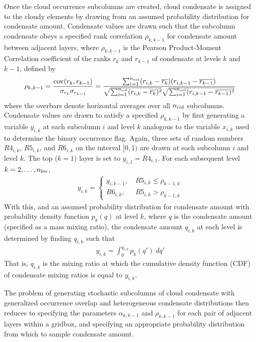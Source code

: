 Once the cloud occurrence subcolumns are created, cloud condensate is assigned to the cloudy elements by drawing from an assumed probability distribution for condensate amount. Condensate values are drawn such that the subcolumn condensate obeys a specified rank correlation $\rho_{k, k-1}$ for condensate amount between adjacent layers, where $\rho_{k, k-1}$ is the Pearson Product-Moment Correlation coefficient of the ranks $r_{k}$ and $r_{k-1}$ of condensate at levels $k$ and $k-1$, defined by
\begin{gather}
    \rho_{k, k-1} = \frac{
        {\rm cov}(r_{k}, r_{k-1})
    }{
        \sigma_{r_{k}} \sigma_{r_{k-1}}
    } = \frac{
        \sum_{i=1}^{n_{\rm col}} (r_{i, k} - \overline{r_{k}})(r_{i, k-1} - \overline{r_{k-1}})
    }{
        \sqrt{\sum_{i=1}^{n_{\rm col}} (r_{i, k} - \overline{r_{k}})^2}
        \sqrt{\sum_{i=1}^{n_{\rm col}} (r_{i, k-1} - \overline{r_{k-1}})^2}
    }
    \label{rankcorr_equation}
\end{gather}
where the overbars denote horizontal averages over all $n_{\rm col}$ subcolumns. Condensate values are drawn to satisfy a specified $\rho_{k, k-1}$ by first generating a variable $y_{i, k}$ at each subcolumn $i$ and level $k$ analogous to the variable $x_{i, k}$ used to determine the binary occurrence flag. Again, three sets of random numbers $R4_{i, k}$, $R5_{i, k}$, and $R6_{i, k}$ on the interval $[0, 1)$ are drawn at each subcolumn $i$ and level $k$. The top ($k = 1$) layer is set to $y_{i, 1} = R4_{i, 1}$. For each subsequent level $k = 2, \ldots, n_{\rm lev}$,
\begin{gather}
    y_{i, k} = \begin{cases}
        y_{i, k-1}, ~ & R5_{i, k} \le \rho_{k-1, k} \\
        R6_{i, k},  ~ & R5_{i, k} > \rho_{k-1, k}
    \end{cases}
\end{gather}
With this, and an assumed probability distribution for condensate amount with probability density function $p_k(q)$ at level $k$, where $q$ is the condensate amount (specified as a mass mixing ratio), the condensate amount $q_{i, k}$ at each level is determined by finding $q_{i, k}$ such that
\begin{gather}
    y_{i, k} = \int_0^{q_{i, k}} p_{k}(q') ~dq'
\end{gather}
That is, $q_{i, k}$ is the mixing ratio at which the cumulative density function (CDF) of condensate mixing ratios is equal to $y_{i, k}$.

The problem of generating stochastic subcolumns of cloud condensate with generalized occurrence overlap and heterogeneous condensate distributions then reduces to specifying the parameters $\alpha_{k, k-1}$ and $\rho_{k, k-1}$ for each pair of adjacent layers within a gridbox, and specifying an appropriate probability distribution from which to sample condensate amount. 

